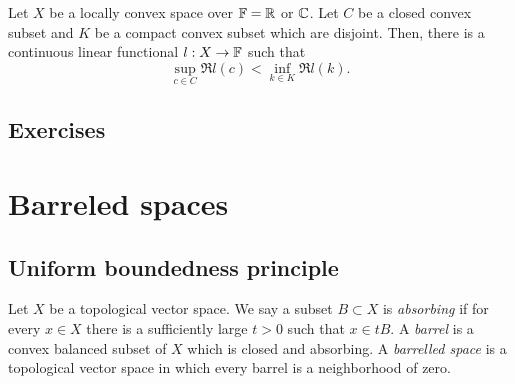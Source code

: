 \documentclass{../../large}
\begin{document}
\begin{prb}

Let $X$ be a locally convex space over $\mathbb{F}=\mathbb{R}$ or $\mathbb{C}$.
Let $C$ be a closed convex subset and $K$ be a compact convex subset which are disjoint.
Then, there is a continuous linear functional $l:X\to\mathbb{F}$ such that
\[\sup_{c\in C}\Re l(c)<\inf_{k\in K}\Re l(k).\]
\end{prb}




\section*{Exercises}
\begin{prb}
\end{prb}





\chapter{Barreled spaces}

\section{Uniform boundedness principle}
\begin{prb}
Let $X$ be a topological vector space.
We say a subset $B\subset X$ is \emph{absorbing} if for every $x\in X$ there is a sufficiently large $t>0$ such that $x\in tB$.
A \emph{barrel} is a convex balanced subset of $X$ which is closed and absorbing.
A \emph{barrelled space} is a topological vector space in which every barrel is a neighborhood of zero.
\end{prb}

\end{document}
